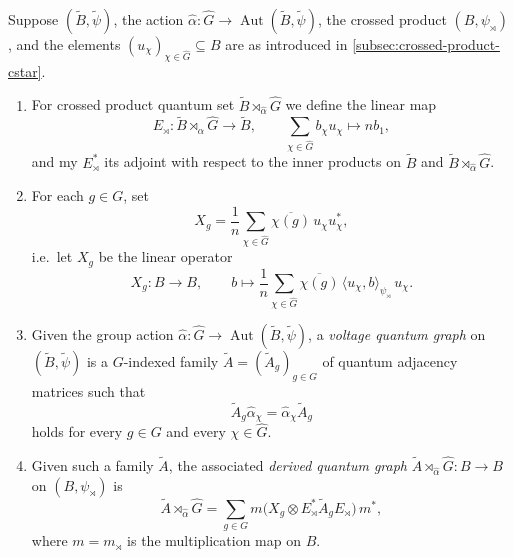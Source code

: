 \begin{definition}
    \label{def:quantum-voltage-graph}
    Suppose \( (\widetilde{B}, \widetilde\psi) \), the action
    \( \widehat\alpha \colon \widehat{G} \to \operatorname{Aut}(\widetilde{B},
    \widetilde\psi) \),
    the crossed product \( (B, \psi_\rtimes) \), and the elements
    \( (u_\chi)_{\chi \in \widehat{G}} \subseteq B \) are as introduced
    in \ref{subsec:crossed-product-cstar}.
    \begin{enumerate}
        \item For crossed product quantum set \( \widetilde{B}
            \rtimes_{\widehat\alpha} \widehat{G} \)
            we define the linear map
            \[
                E_{\rtimes}: \widetilde{B} \rtimes_{\widehat\alpha} \widehat{G}
                \rightarrow \widetilde{B}, \qquad \sum_{\chi \in \widehat{G}}
                b_{\chi} u_{\chi} \mapsto n b_{1},
            \]
            and my \( E_{\rtimes}^{*} \) its adjoint with respect to
            the inner products on \( \widetilde{B} \) and \( \widetilde{B}
            \rtimes_{\widehat\alpha} \widehat{G} \).
        \item For each \( g \in G \), set
            \[
                X_g = \frac{1}{n} \sum_{\chi \in \widehat{G}}
                \overline{\chi(g)}\, u_\chi u_\chi^*,
            \]
            i.e.\ let \( X_g \) be the linear operator
            \[
                X_g \colon B \to B, \qquad
                b \mapsto \frac{1}{n} \sum_{\chi \in \widehat{G}}
                \overline{\chi(g)}\, \langle u_\chi, b
                \rangle_{\psi_\rtimes}\, u_\chi.
            \]
        \item Given the group action
            \( \widehat\alpha \colon \widehat{G} \to
            \operatorname{Aut}(\widetilde{B}, \widetilde\psi) \),
            a \emph{voltage quantum graph} on \( (\widetilde{B},
            \widetilde\psi) \)
            is a \( G \)-indexed family
            \( \widetilde{A} = (\widetilde{A}_g)_{g \in G} \) of quantum
            adjacency matrices such that
            \[
                \widetilde{A}_g \widehat\alpha_\chi = \widehat\alpha_\chi
                \widetilde{A}_g
            \]
            holds for every \( g \in G \) and every \( \chi \in \widehat{G} \).
        \item Given such a family \( \widetilde{A} \), the associated
            \emph{derived quantum graph}
            \( \widetilde{A} \rtimes_{\widehat\alpha} \widehat{G}
            \colon B \to B \)
            on \( (B, \psi_\rtimes) \) is
            \[
                \widetilde{A} \rtimes_{\widehat\alpha} \widehat{G}
                = \sum_{g \in G} m\big( X_g \otimes E_\rtimes^*
                \widetilde{A}_g E_\rtimes \big)\, m^*,
            \]
            where \( m = m_\rtimes \) is the multiplication map on \( B \).
    \end{enumerate}
\end{definition}

